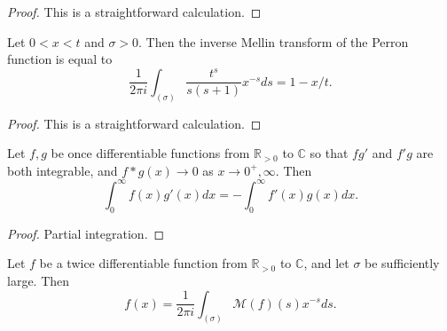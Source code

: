 \begin{proof}
\leanok
This is a straightforward calculation.
\end{proof}


\begin{lemma}[PerronInverseMellin_gt]\label{PerronInverseMellin_gt}
\leanok
Let $0 < x < t$ and $\sigma>0$. Then the inverse Mellin transform of the Perron function is equal
to
$$\frac{1}{2\pi i}\int_{(\sigma)}\frac{t^s}{s(s+1)}x^{-s}ds = 1 - x / t.$$
\end{lemma}


\begin{proof}
\leanok
This is a straightforward calculation.
\end{proof}


\begin{lemma}[PartialIntegration]\label{PartialIntegration}\leanok
Let $f, g$ be once differentiable functions from $\mathbb{R}_{>0}$ to $\mathbb{C}$ so that $fg'$
and $f'g$ are both integrable, and $f*g (x)\to 0$ as $x\to 0^+,\infty$.
Then
$$
\int_0^\infty f(x)g'(x) dx = -\int_0^\infty f'(x)g(x)dx.
$$
\end{lemma}


\begin{proof}\leanok
Partial integration.
\end{proof}


\begin{theorem}[MellinInversion]\label{MellinInversion}\leanok
Let $f$ be a twice differentiable function from $\mathbb{R}_{>0}$ to $\mathbb{C}$, and
let $\sigma$
be sufficiently large. Then
$$f(x) = \frac{1}{2\pi i}\int_{(\sigma)}\mathcal{M}(f)(s)x^{-s}ds.$$
\end{theorem}



